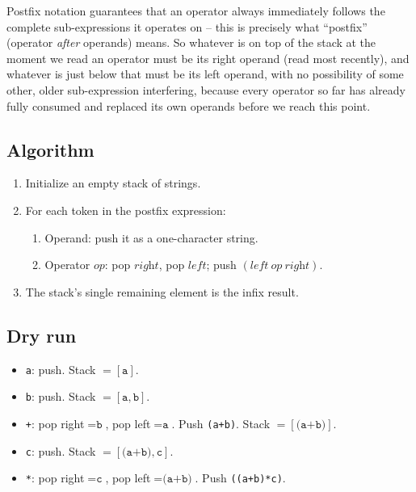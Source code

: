 Postfix notation guarantees that an operator always immediately follows
the complete sub-expressions it operates on -- this is precisely what
``postfix'' (operator \emph{after} operands) means. So whatever is on top
of the stack at the moment we read an operator must be its right operand
(read most recently), and whatever is just below that must be its left
operand, with no possibility of some other, older sub-expression
interfering, because every operator so far has already fully consumed and
replaced its own operands before we reach this point.

\subsection*{Algorithm}

\begin{enumerate}
  \item Initialize an empty stack of strings.
  \item For each token in the postfix expression:
  \begin{enumerate}
    \item Operand: push it as a one-character string.
    \item Operator $\textit{op}$: pop $\textit{right}$, pop
          $\textit{left}$; push $(\textit{left}\ \textit{op}\
          \textit{right})$.
  \end{enumerate}
  \item The stack's single remaining element is the infix result.
\end{enumerate}

\subsection*{Dry run}


\begin{itemize}
  \item \texttt{a}: push. Stack $=[\texttt{a}]$.
  \item \texttt{b}: push. Stack $=[\texttt{a},\texttt{b}]$.
  \item \texttt{+}: pop right$=\texttt{b}$, pop left$=\texttt{a}$. Push
        \texttt{(a+b)}. Stack $=[\texttt{(a+b)}]$.
  \item \texttt{c}: push. Stack $=[\texttt{(a+b)},\texttt{c}]$.
  \item \texttt{*}: pop right$=\texttt{c}$, pop left$=\texttt{(a+b)}$.
        Push \texttt{((a+b)*c)}.
\end{itemize}

